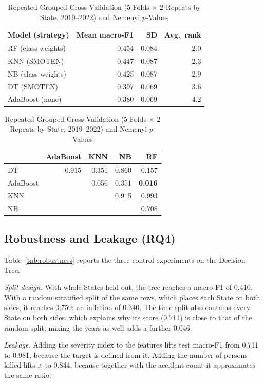 \documentclass[conference]{IEEEtran}
\begin{document}
\begin{table}[t]
\caption{Repeated Grouped Cross-Validation (5 Folds $\times$ 2 Repeats by State, 2019--2022) and Nemenyi $p$-Values}
\label{tab:friedman}
\centering
\footnotesize
\begin{tabular}{@{}lrrr@{}}
\toprule
Model (strategy) & Mean macro-F1 & SD & Avg.\ rank \\
\midrule
RF (class weights) & 0.454 & 0.084 & 2.0 \\
KNN (SMOTEN) & 0.447 & 0.087 & 2.3 \\
NB (class weights) & 0.425 & 0.087 & 2.9 \\
DT (SMOTEN) & 0.397 & 0.069 & 3.6 \\
AdaBoost (none) & 0.380 & 0.069 & 4.2 \\
\bottomrule
\end{tabular}

\vspace{4pt}
\begin{tabular}{@{}lrrrr@{}}
\toprule
 & AdaBoost & KNN & NB & RF \\
\midrule
DT & 0.915 & 0.351 & 0.860 & 0.157 \\
AdaBoost & & 0.056 & 0.351 & \textbf{0.016} \\
KNN & & & 0.915 & 0.993 \\
NB & & & & 0.708 \\
\bottomrule
\end{tabular}
\end{table}

\subsection{Robustness and Leakage (RQ4)}
Table~\ref{tab:robustness} reports the three control experiments on the Decision Tree.

\emph{Split design.} With whole States held out, the tree reaches a macro-F1 of 0.410. With a random stratified split of the same rows, which places each State on both sides, it reaches 0.750: an inflation of 0.340. The time split also contains every State on both sides, which explains why its score (0.711) is close to that of the random split; mixing the years as well adds a further 0.046.

\emph{Leakage.} Adding the severity index to the features lifts test macro-F1 from 0.711 to 0.981, because the target is defined from it. Adding the number of persons killed lifts it to 0.844, because together with the accident count it approximates the same ratio.
\end{document}
